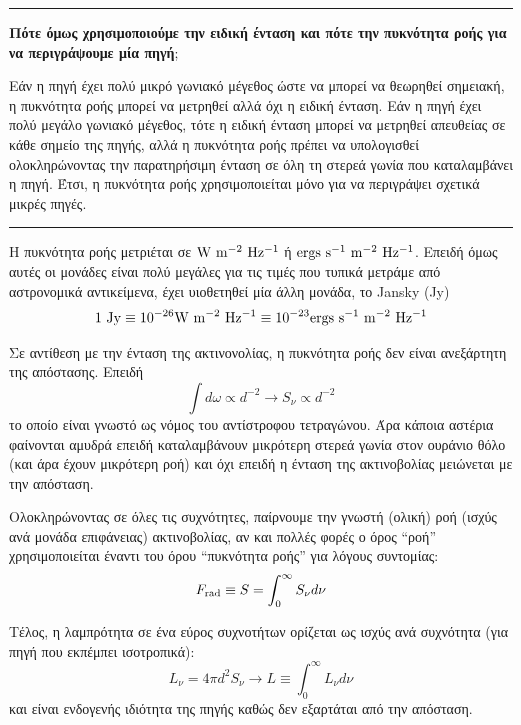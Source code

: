 {\color{red} \hrule}
\textbf{Πότε όμως χρησιμοποιούμε την ειδική ένταση και πότε την πυκνότητα ροής για να περιγράψουμε μία πηγή};

Εάν η πηγή έχει πολύ μικρό γωνιακό μέγεθος ώστε να μπορεί να θεωρηθεί σημειακή, η πυκνότητα ροής μπορεί να μετρηθεί αλλά όχι η ειδική ένταση.
Εάν η πηγή έχει πολύ μεγάλο γωνιακό μέγεθος, τότε η ειδική ένταση μπορεί να μετρηθεί απευθείας σε κάθε σημείο της πηγής, αλλά η πυκνότητα ροής πρέπει να υπολογισθεί ολοκληρώνοντας την παρατηρήσιμη ένταση σε όλη τη στερεά γωνία που καταλαμβάνει η πηγή. Έτσι, η πυκνότητα ροής χρησιμοποιείται μόνο για να περιγράψει σχετικά μικρές πηγές.
{\color{red} \hrule}

Η πυκνότητα ροής μετριέται σε $\rm W \ m^{-2} \ Hz^{-1}$ ή $\rm ergs \ s^{-1} \ m^{-2} \ Hz^{-1}$. Επειδή όμως αυτές οι μονάδες είναι πολύ μεγάλες για τις τιμές που τυπικά μετράμε από αστρονομικά αντικείμενα, έχει υιοθετηθεί μία άλλη μονάδα, το Jansky (Jy) 
$$\rm 1 \ Jy \equiv 10^{-26} W \ m^{-2} \ Hz^{-1} \equiv 10^{-23} ergs \ s^{-1} \ m^{-2} \ Hz^{-1}$$

Σε αντίθεση με την ένταση της ακτινονολίας, η πυκνότητα ροής δεν είναι ανεξάρτητη της απόστασης. Επειδή $$\int d\omega \propto d^{-2} \longrightarrow S_{\nu} \propto d^{-2}$$ το οποίο είναι γνωστό ως νόμος του αντίστροφου τετραγώνου. Άρα κάποια αστέρια φαίνονται αμυδρά επειδή καταλαμβάνουν μικρότερη στερεά γωνία στον ουράνιο θόλο (και άρα έχουν μικρότερη ροή) και όχι επειδή η ένταση της ακτινοβολίας μειώνεται με την απόσταση.

Ολοκληρώνοντας σε όλες τις συχνότητες, παίρνουμε την γνωστή (ολική) ροή (ισχύς ανά μονάδα επιφάνειας) ακτινοβολίας, αν και πολλές φορές ο όρος ``ροή'' χρησιμοποιείται έναντι του όρου ``πυκνότητα ροής'' για λόγους συντομίας:
\begin{equation}
    F_{\rm rad} \equiv S = \int_{0}^{\infty} S_{\nu} d\nu
\end{equation}

Τέλος, η λαμπρότητα σε ένα εύρος συχνοτήτων ορίζεται ως ισχύς ανά συχνότητα
(για πηγή που εκπέμπει ισοτροπικά):
\begin{equation}
    L_{\nu} = 4\pi d^2 S_{\nu} \longrightarrow L \equiv \int_{0}^{\infty} L_{\nu} d\nu
\end{equation}
και είναι ενδογενής ιδιότητα της πηγής καθώς δεν εξαρτάται από την απόσταση.



